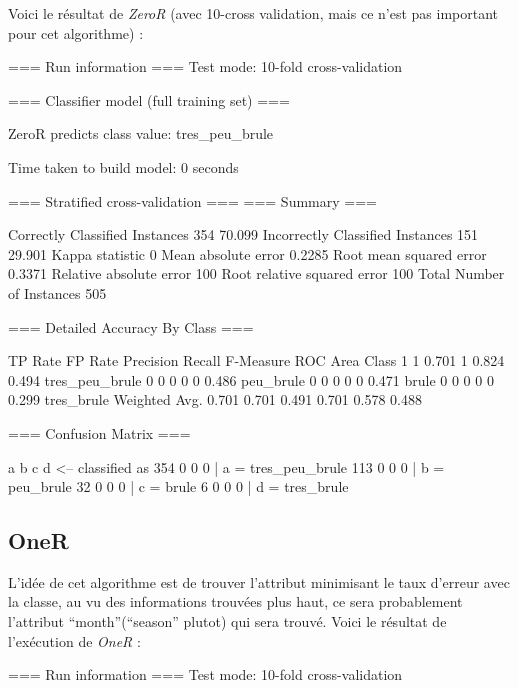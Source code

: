 \documentclass{article}
\begin{document}
\begin{sffamily}
Voici le résultat de \textit{ZeroR} (avec 10-cross validation, mais ce n'est pas important pour cet algorithme) :

\begin{center}
	\begin{boxedverbatim}
=== Run information ===
Test mode:    10-fold cross-validation

=== Classifier model (full training set) ===

ZeroR predicts class value: tres_peu_brule

Time taken to build model: 0 seconds

=== Stratified cross-validation ===
=== Summary ===

Correctly Classified Instances         354               70.099  %
Incorrectly Classified Instances       151               29.901  %
Kappa statistic                          0     
Mean absolute error                      0.2285
Root mean squared error                  0.3371
Relative absolute error                100      %
Root relative squared error            100      %
Total Number of Instances              505     

=== Detailed Accuracy By Class ===

            TP Rate FP Rate Precision Recall F-Measure ROC Area    Class
              1       1       0.701     1      0.824    0.494   tres_peu_brule
              0       0       0         0      0        0.486   peu_brule
              0       0       0         0      0        0.471   brule
              0       0       0         0      0        0.299   tres_brule
Weighted Avg. 0.701   0.701   0.491     0.701  0.578    0.488




=== Confusion Matrix ===

   a   b   c   d   <-- classified as
 354   0   0   0 |   a = tres_peu_brule
 113   0   0   0 |   b = peu_brule
  32   0   0   0 |   c = brule
   6   0   0   0 |   d = tres_brule

	\end{boxedverbatim}
\end{center}

\subsection*{OneR}

L'idée de cet algorithme est de trouver l'attribut minimisant le taux d'erreur avec la classe, au vu des informations trouvées 
plus haut, ce sera probablement l'attribut ``month''(``season'' plutot) qui sera trouvé. Voici le résultat de l'exécution de 
\textit{OneR} :
\begin{center}
	\begin{boxedverbatim}
=== Run information ===
Test mode:    10-fold cross-validation


\end{boxedverbatim}
\end{center}
\end{sffamily}
\end{document}
